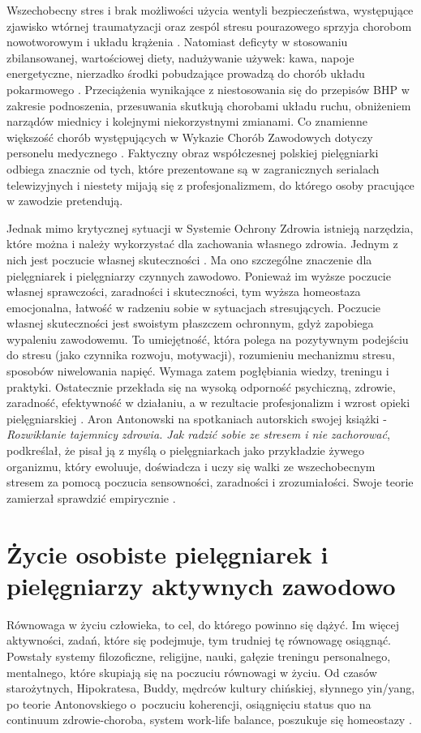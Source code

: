 \documentclass[a4paper,12pt,twoside,openright]{mwrep}
\begin{document}
Wszechobecny stres i brak możliwości użycia wentyli bezpieczeństwa, występujące zjawisko wtórnej traumatyzacji oraz zespól stresu pourazowego sprzyja chorobom nowotworowym i układu krążenia \cite{skutki}. Natomiast deficyty w stosowaniu zbilansowanej, wartościowej diety, nadużywanie używek: kawa, napoje energetyczne, nierzadko środki pobudzające prowadzą do chorób układu pokarmowego \cite{p.p}. Przeciążenia wynikające z niestosowania się do przepisów BHP w zakresie podnoszenia, przesuwania skutkują chorobami układu ruchu, obniżeniem narządów miednicy i kolejnymi niekorzystnymi zmianami. Co znamienne większość chorób występujących w Wykazie Chorób Zawodowych dotyczy personelu medycznego \cite{wykaz}. Faktyczny obraz współczesnej polskiej pielęgniarki odbiega znacznie od tych, które prezentowane są w zagranicznych serialach telewizyjnych i niestety mijają się z profesjonalizmem, do którego osoby pracujące w zawodzie pretendują.

Jednak mimo krytycznej sytuacji w Systemie Ochrony Zdrowia istnieją narzędzia, które można i należy wykorzystać dla zachowania własnego zdrowia. Jednym z nich jest poczucie własnej skuteczności \cite{skutecznosc}. Ma ono szczególne znaczenie dla pielęgniarek i pielęgniarzy czynnych zawodowo. Ponieważ im wyższe poczucie własnej sprawczości, zaradności i skuteczności, tym wyższa homeostaza emocjonalna, łatwość w radzeniu sobie w sytuacjach stresujących. Poczucie własnej skuteczności jest swoistym płaszczem ochronnym, gdyż zapobiega wypaleniu zawodowemu. To umiejętność, która polega na pozytywnym podejściu do stresu (jako czynnika rozwoju, motywacji), rozumieniu mechanizmu stresu, sposobów niwelowania napięć. Wymaga zatem pogłębiania wiedzy, treningu i praktyki. Ostatecznie przekłada się na wysoką odporność psychiczną, zdrowie, zaradność, efektywność w działaniu, a w rezultacie profesjonalizm i wzrost opieki pielęgniarskiej \cite{stres}. Aron Antonowski  na spotkaniach autorskich  swojej książki - \textit {Rozwikłanie tajemnicy zdrowia. Jak radzić sobie ze stresem i nie zachorować}, podkreślał, że pisał ją z myślą o pielęgniarkach jako przykładzie żywego organizmu, który ewoluuje, doświadcza i uczy się walki ze wszechobecnym stresem za pomocą poczucia sensowności, zaradności i zrozumiałości. Swoje teorie zamierzał sprawdzić empirycznie \cite{aron}.

\section{Życie osobiste pielęgniarek i pielęgniarzy aktywnych zawodowo}
\label{sectionZycieOsobiste}
Równowaga w życiu człowieka, to cel, do którego powinno się dążyć. Im więcej aktywności, zadań, które się podejmuje, tym trudniej tę równowagę osiągnąć. Powstały systemy filozoficzne, religijne, nauki, gałęzie treningu personalnego, mentalnego, które skupiają się na poczuciu równowagi w życiu. Od czasów starożytnych, Hipokratesa, Buddy, mędrców kultury chińskiej, słynnego yin/yang, po teorie Antonovskiego o~poczuciu koherencji, osiągnięciu status quo na continuum zdrowie-choroba, system work-life balance, poszukuje się homeostazy \cite{salutogeneza}.
\end{document}
